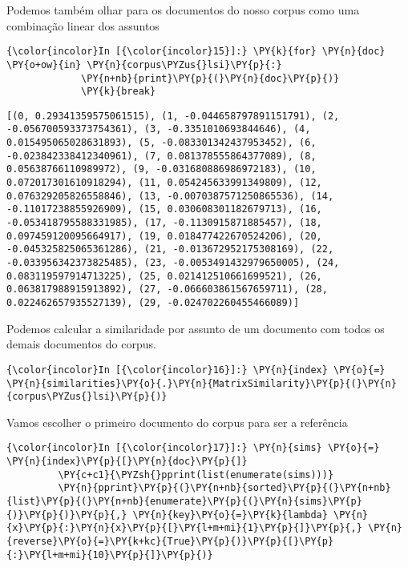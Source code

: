     Podemos também olhar para os documentos do nosso corpus como uma
combinação linear dos assuntos

    \begin{Verbatim}[commandchars=\\\{\}]
{\color{incolor}In [{\color{incolor}15}]:} \PY{k}{for} \PY{n}{doc}  \PY{o+ow}{in} \PY{n}{corpus\PYZus{}lsi}\PY{p}{:}
             \PY{n+nb}{print}\PY{p}{(}\PY{n}{doc}\PY{p}{)}
             \PY{k}{break}
\end{Verbatim}

    \begin{Verbatim}[commandchars=\\\{\}]
[(0, 0.29341359575061515), (1, -0.044658797891151791), (2, -0.056700593373754361), (3, -0.3351010693844646), (4, 0.015495065028631893), (5, -0.083301342437953452), (6, -0.023842338412340961), (7, 0.081378555864377089), (8, 0.05638766110989972), (9, -0.031680886986972183), (10, 0.072017301610918294), (11, 0.054245633991349809), (12, 0.076329205826558846), (13, -0.0070387571250865536), (14, -0.11017238855926909), (15, 0.030608301182679713), (16, -0.053418795588331985), (17, -0.1130915871885457), (18, 0.097459120095664917), (19, 0.018477422670524206), (20, -0.045325825065361286), (21, -0.013672952175308169), (22, -0.033956342373825485), (23, -0.0053491432979650005), (24, 0.083119597914713225), (25, 0.021412510661699521), (26, 0.063817988915913892), (27, -0.066603861567659711), (28, 0.022462657935527139), (29, -0.024702260455466089)]

    \end{Verbatim}

    Podemos calcular a similaridade por assunto de um documento com todos os
demais documentos do corpus.

    \begin{Verbatim}[commandchars=\\\{\}]
{\color{incolor}In [{\color{incolor}16}]:} \PY{n}{index} \PY{o}{=} \PY{n}{similarities}\PY{o}{.}\PY{n}{MatrixSimilarity}\PY{p}{(}\PY{n}{corpus\PYZus{}lsi}\PY{p}{)}
\end{Verbatim}

    Vamos escolher o primeiro documento do corpus para ser a referência

    \begin{Verbatim}[commandchars=\\\{\}]
{\color{incolor}In [{\color{incolor}17}]:} \PY{n}{sims} \PY{o}{=} \PY{n}{index}\PY{p}{[}\PY{n}{doc}\PY{p}{]}
         \PY{c+c1}{\PYZsh{}pprint(list(enumerate(sims)))}
         \PY{n}{pprint}\PY{p}{(}\PY{n+nb}{sorted}\PY{p}{(}\PY{n+nb}{list}\PY{p}{(}\PY{n+nb}{enumerate}\PY{p}{(}\PY{n}{sims}\PY{p}{)}\PY{p}{)}\PY{p}{,} \PY{n}{key}\PY{o}{=}\PY{k}{lambda} \PY{n}{x}\PY{p}{:}\PY{n}{x}\PY{p}{[}\PY{l+m+mi}{1}\PY{p}{]}\PY{p}{,} \PY{n}{reverse}\PY{o}{=}\PY{k+kc}{True}\PY{p}{)}\PY{p}{[}\PY{p}{:}\PY{l+m+mi}{10}\PY{p}{]}\PY{p}{)}
\end{Verbatim}

